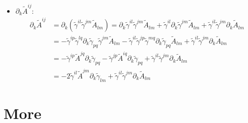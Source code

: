 \documentclass[prd,aps,a4paper,superscriptaddress,onecolumn,footinbib]{revtex4}
\begin{document}
\begin{itemize}
\item $\partial_k\tilde{A}^{ij}$:
  \begin{align}
    \partial_k\tilde{A}^{ij}
    &=\partial_k
    \left(
      \tilde\gamma^{il}\tilde\gamma^{jm}\tilde{A}_{lm}
    \right)
    =
    \partial_k\tilde\gamma^{il}\tilde\gamma^{jm}\tilde{A}_{lm}+
    \tilde\gamma^{il}\partial_k\tilde\gamma^{jm}\tilde{A}_{lm}+
    \tilde\gamma^{il}\tilde\gamma^{jm}\partial_k\tilde{A}_{lm}
    \\
    &=
    -\tilde\gamma^{ip}\tilde\gamma^{lq}\partial_k\tilde\gamma_{pq}\tilde\gamma^{jm}\tilde{A}_{lm}
    -\tilde\gamma^{il}\tilde\gamma^{jp}\tilde\gamma^{mq}\partial_k\tilde\gamma_{pq}\tilde{A}_{lm}
    +\tilde\gamma^{il}\tilde\gamma^{jm}\partial_k\tilde{A}_{lm}
    \\
    &=
    -\tilde\gamma^{ip}\tilde{A}^{jq}\partial_k\tilde\gamma_{pq}
    -\tilde\gamma^{jp}\tilde{A}^{iq}\partial_k\tilde\gamma_{pq}
    +\tilde\gamma^{il}\tilde\gamma^{jm}\partial_k\tilde{A}_{lm}
    \\
    &=
    -2\tilde\gamma^{il}\tilde{A}^{jm}\partial_k\tilde\gamma_{lm}
    +\tilde\gamma^{il}\tilde\gamma^{jm}\partial_k\tilde{A}_{lm}
  \end{align}
\end{itemize}


\section{More}
\cite{alexander1990solving}





\end{document}

